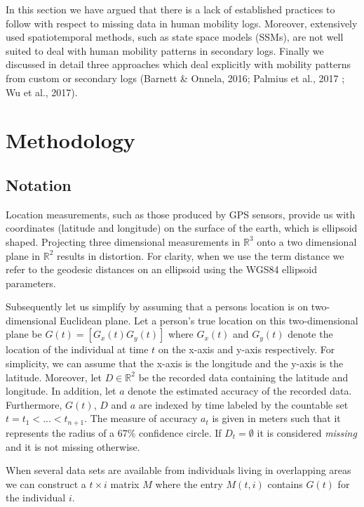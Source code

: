 \documentclass[man]{apa6}
\theoremstyle{definition}
\theoremstyle{definition}
\theoremstyle{definition}
\theoremstyle{remark}
\begin{document}
In this section we have argued that there is a lack of established
practices to follow with respect to missing data in human mobility logs.
Moreover, extensively used spatiotemporal methods, such as state space
models (SSMs), are not well suited to deal with human mobility patterns
in secondary logs. Finally we discussed in detail three approaches which
deal explicitly with mobility patterns from custom or secondary logs
(Barnett \& Onnela, 2016; Palmius et al., 2017 ; Wu et al., 2017).

\section{Methodology}\label{methodology}

\subsection{Notation}\label{notation}

Location measurements, such as those produced by GPS sensors, provide us
with coordinates (latitude and longitude) on the surface of the earth,
which is ellipsoid shaped. Projecting three dimensional measurements in
\(\mathbb{R}^3\) onto a two dimensional plane in \(\mathbb{R}^2\)
results in distortion. For clarity, when we use the term distance we
refer to the geodesic distances on an ellipsoid using the WGS84
ellipsoid parameters.

Subsequently let us simplify by assuming that a persons location is on
two-dimensional Euclidean plane. Let a person's true location on this
two-dimensional plane be \(G(t) = [G_x(t) G_y(t)]\) where \(G_x(t)\) and
\(G_y(t)\) denote the location of the individual at time \(t\) on the
x-axis and y-axis respectively. For simplicity, we can assume that the
x-axis is the longitude and the y-axis is the latitude. Moreover, let
\(D \in \mathbb{R}^2\) be the recorded data containing the latitude and
longitude. In addition, let \(a\) denote the estimated accuracy of the
recorded data. Furthermore, \(G(t)\), \(D\) and \(a\) are indexed by
time labeled by the countable set \(t = t_1 < ... < t_{n+1}\). The
measure of accuracy \(a_t\) is given in meters such that it represents
the radius of a 67\% confidence circle. If \(D_t = \emptyset\) it is
considered \emph{missing} and it is not missing otherwise.

When several data sets are available from individuals living in
overlapping areas we can construct a \(t \times i\) matrix \(M\) where
the entry \(M(t,i)\) contains \(G(t)\) for the individual \(i\).
\end{document}
